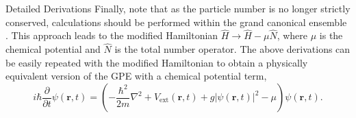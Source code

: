 \begin{chapter}{Detailed Derivations\label{app:App2}}
Finally, note that as the particle number is no longer strictly conserved, calculations should be performed within the grand canonical ensemble \cite{huang1987statistical}. This approach leads to the modified Hamiltonian $\hat{H} \rightarrow \hat{H} -\mu\hat{N}$, where $\mu$ is the chemical potential and $\hat{N}$ is the total number operator. The above derivations can be easily repeated with the modified Hamiltonian to obtain a physically equivalent version of the GPE with a chemical potential term,
\begin{equation}
i \hbar\frac{\partial}{\partial t}\psi(\mathbf{r},t) = \left ( -\frac{\hbar^2}{2m}\nabla^2+V_{\mathrm{ext}}(\mathbf{r},t) + g|\psi(\mathbf{r},t)|^2 - \mu \right ) \psi(\mathbf{r},t).
\end{equation}

\end{chapter}

